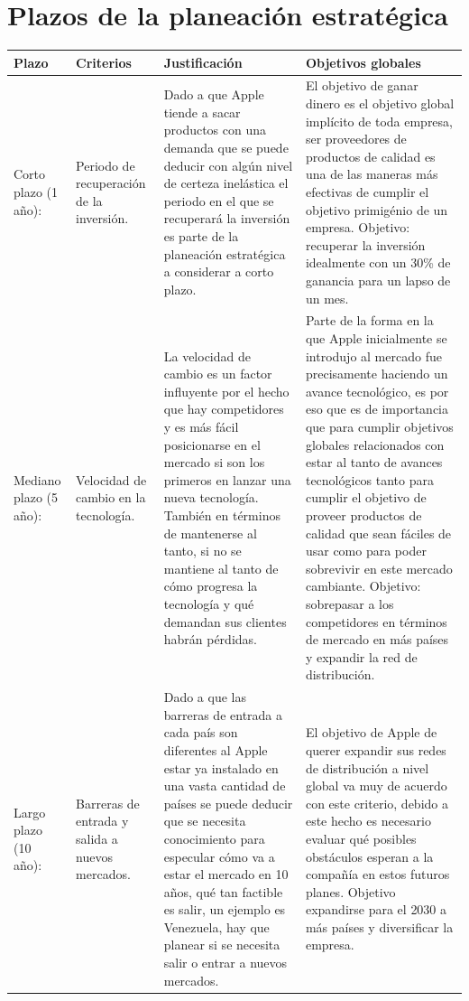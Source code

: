 \documentclass{article}
\begin{document}
\section{Plazos de la planeación estratégica}
\begin{center}
    \begin{tabular}{ |p{2cm}|p{2cm}|p{5cm}|p{5cm}| }
        \hline
            Plazo & Criterios & Justificación & Objetivos globales\\
        \hline 
            Corto plazo (1 año): 
            & 
            Periodo de recuperación de la inversión.
            & 
            Dado a que Apple tiende a sacar productos con una demanda que se puede deducir con algún nivel de certeza inelástica el periodo en el que se recuperará la inversión es parte de la planeación estratégica a considerar a corto plazo.
            & 
            El objetivo de ganar dinero es el objetivo global implícito de toda empresa, ser proveedores de productos de calidad es una de las maneras más efectivas de cumplir el objetivo primigénio de un empresa. Objetivo: recuperar la inversión idealmente con un 30\% de ganancia para un lapso de un mes.
            \\ 
        \hline
            Mediano plazo (5 año): 
            & 
            Velocidad de cambio en la tecnología.
            & 
            La velocidad de cambio es un factor influyente por el hecho que hay competidores y es más fácil posicionarse en el mercado si son los primeros en lanzar una nueva tecnología. También en términos de mantenerse al tanto, si no se mantiene al tanto de cómo progresa la tecnología y qué demandan sus clientes habrán pérdidas.
            & 
            Parte de la forma en la que Apple inicialmente se introdujo al mercado fue precisamente haciendo un avance tecnológico, es por eso que es de importancia que para cumplir objetivos globales relacionados con estar al tanto de avances tecnológicos tanto para cumplir el objetivo de proveer productos de calidad que sean fáciles de usar como para poder sobrevivir en este mercado cambiante. Objetivo: sobrepasar a los competidores en términos de mercado en más países y expandir la red de distribución.
            \\ 
        \hline
            Largo plazo (10 año): 
            & 
            Barreras de entrada y salida a nuevos mercados.
            & 
            Dado a que las barreras de entrada a cada país son diferentes al Apple estar ya instalado en una vasta cantidad de países se puede deducir que se necesita conocimiento para especular cómo va a estar el mercado en 10 años, qué tan factible es salir, un ejemplo es Venezuela, hay que planear si se necesita salir o entrar a nuevos mercados.
            & 
            El objetivo de Apple de querer expandir sus redes de distribución a nivel global va muy de acuerdo con este criterio, debido a este hecho es necesario evaluar qué posibles obstáculos esperan a la compañía en estos futuros planes. Objetivo expandirse para el 2030 a más países y diversificar la empresa. \\ 
        \hline
    \end{tabular}
\end{center}
\end{document}
